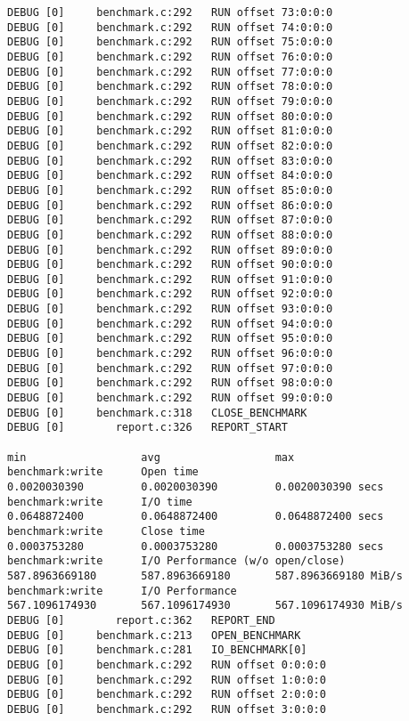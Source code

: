 \begin{verbatim}
DEBUG [0]     benchmark.c:292   RUN offset 73:0:0:0
DEBUG [0]     benchmark.c:292   RUN offset 74:0:0:0
DEBUG [0]     benchmark.c:292   RUN offset 75:0:0:0
DEBUG [0]     benchmark.c:292   RUN offset 76:0:0:0
DEBUG [0]     benchmark.c:292   RUN offset 77:0:0:0
DEBUG [0]     benchmark.c:292   RUN offset 78:0:0:0
DEBUG [0]     benchmark.c:292   RUN offset 79:0:0:0
DEBUG [0]     benchmark.c:292   RUN offset 80:0:0:0
DEBUG [0]     benchmark.c:292   RUN offset 81:0:0:0
DEBUG [0]     benchmark.c:292   RUN offset 82:0:0:0
DEBUG [0]     benchmark.c:292   RUN offset 83:0:0:0
DEBUG [0]     benchmark.c:292   RUN offset 84:0:0:0
DEBUG [0]     benchmark.c:292   RUN offset 85:0:0:0
DEBUG [0]     benchmark.c:292   RUN offset 86:0:0:0
DEBUG [0]     benchmark.c:292   RUN offset 87:0:0:0
DEBUG [0]     benchmark.c:292   RUN offset 88:0:0:0
DEBUG [0]     benchmark.c:292   RUN offset 89:0:0:0
DEBUG [0]     benchmark.c:292   RUN offset 90:0:0:0
DEBUG [0]     benchmark.c:292   RUN offset 91:0:0:0
DEBUG [0]     benchmark.c:292   RUN offset 92:0:0:0
DEBUG [0]     benchmark.c:292   RUN offset 93:0:0:0
DEBUG [0]     benchmark.c:292   RUN offset 94:0:0:0
DEBUG [0]     benchmark.c:292   RUN offset 95:0:0:0
DEBUG [0]     benchmark.c:292   RUN offset 96:0:0:0
DEBUG [0]     benchmark.c:292   RUN offset 97:0:0:0
DEBUG [0]     benchmark.c:292   RUN offset 98:0:0:0
DEBUG [0]     benchmark.c:292   RUN offset 99:0:0:0
DEBUG [0]     benchmark.c:318   CLOSE_BENCHMARK
DEBUG [0]        report.c:326   REPORT_START
                                                                               min                  avg                  max
benchmark:write      Open time                                        0.0020030390         0.0020030390         0.0020030390 secs
benchmark:write      I/O time                                         0.0648872400         0.0648872400         0.0648872400 secs
benchmark:write      Close time                                       0.0003753280         0.0003753280         0.0003753280 secs
benchmark:write      I/O Performance (w/o open/close)               587.8963669180       587.8963669180       587.8963669180 MiB/s
benchmark:write      I/O Performance                                567.1096174930       567.1096174930       567.1096174930 MiB/s
DEBUG [0]        report.c:362   REPORT_END
DEBUG [0]     benchmark.c:213   OPEN_BENCHMARK
DEBUG [0]     benchmark.c:281   IO_BENCHMARK[0]
DEBUG [0]     benchmark.c:292   RUN offset 0:0:0:0
DEBUG [0]     benchmark.c:292   RUN offset 1:0:0:0
DEBUG [0]     benchmark.c:292   RUN offset 2:0:0:0
DEBUG [0]     benchmark.c:292   RUN offset 3:0:0:0

\end{verbatim}
